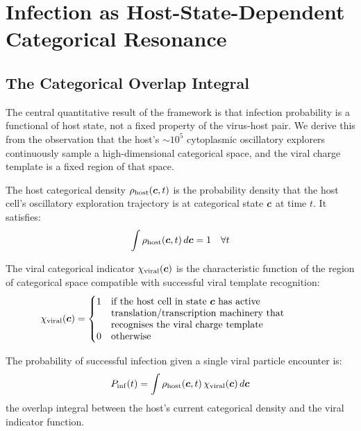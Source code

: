 \section{Infection as Host-State-Dependent Categorical Resonance}
\label{v:sec:resonance}

\subsection{The Categorical Overlap Integral}

The central quantitative result of the framework is that infection probability is a functional of host state, not a fixed property of the virus-host pair. We derive this from the observation that the host's $\sim\!10^5$ cytoplasmic oscillatory explorers continuously sample a high-dimensional categorical space, and the viral charge template is a fixed region of that space.

\begin{definition}
The host categorical density $\rho_{\mathrm{host}}(\boldsymbol{c}, t)$ is the probability density that the host cell's oscillatory exploration trajectory is at categorical state $\boldsymbol{c}$ at time $t$. It satisfies:
\begin{equation}
  \int \rho_{\mathrm{host}}(\boldsymbol{c}, t)\,d\boldsymbol{c} = 1 \quad \forall t
\end{equation}
\end{definition}

\begin{definition}
The viral categorical indicator $\chi_{\mathrm{viral}}(\boldsymbol{c})$ is the characteristic function of the region of categorical space compatible with successful viral template recognition:
\begin{equation}
  \chiviral(\vv{c}) = \begin{cases}
    1 & \parbox[t]{0.62\columnwidth}{\raggedright if the host cell in state $\vv{c}$ has active translation/transcription machinery that recognises the viral charge template}\\[1.2em]
    0 & \text{otherwise}
  \end{cases}
\end{equation}
\end{definition}

\begin{theorem}
\label{v:thm:infection_prob}
The probability of successful infection given a single viral particle encounter is:
\begin{equation}
  P_{\mathrm{inf}}(t) = \int \rho_{\mathrm{host}}(\boldsymbol{c}, t)\, \chi_{\mathrm{viral}}(\boldsymbol{c})\,d\boldsymbol{c}
  \label{v:eq:infection_prob}
\end{equation}
the overlap integral between the host's current categorical density and the viral indicator function.
\end{theorem}

